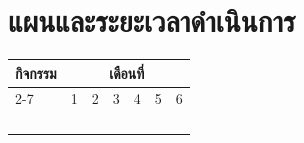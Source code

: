 \section{แผนและระยะเวลาดำเนินการ}


\begin{table}[H]
    \centering
    \begin{tabular}{|p{6cm}|c|c|c|c|c|c|}
        \hline
        \multirow{2}{*}{\centering กิจกรรม} & \multicolumn{6}{c|}{เดือนที่} \\
        \cline{2-7}
                                            & 1 & 2 & 3 & 4 & 5 & 6 \\
        \hline
        & & & & & & \\
        \hline
        & & & & & & \\
        \hline
        & & & & & & \\
        \hline
        & & & & & & \\
        \hline
    \end{tabular}
\end{table}
